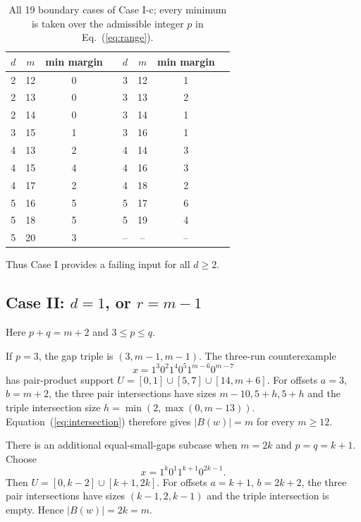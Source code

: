 \documentclass[11pt,a4paper]{article}
\newcommand{\wt}[1]{\lvert #1\rvert}
\begin{document}
\begin{table}[ht]
\centering\small\setlength{\tabcolsep}{7pt}
\begin{tabular}{cccc|cccc}
\toprule
$d$ & $m$ & min margin & \hspace{6mm} & $d$ & $m$ & min margin & \\\midrule
2&12&0&&3&12&1&\\
2&13&0&&3&13&2&\\
2&14&0&&3&14&1&\\
3&15&1&&3&16&1&\\
4&13&2&&4&14&3&\\
4&15&4&&4&16&3&\\
4&17&2&&4&18&2&\\
5&16&5&&5&17&6&\\
5&18&5&&5&19&4&\\
5&20&3&&--&--&--&\\
\bottomrule
\end{tabular}
\caption{All 19 boundary cases of Case I-c; every minimum is taken over the admissible integer $p$ in Eq.~(\ref{eq:range}).}\label{tab:boundary}
\end{table}
Thus Case I provides a failing input for all $d\ge2$.

\subsection{Case II: $d=1$, or $r=m-1$}
Here $p+q=m+2$ and $3\le p\le q$.

If $p=3$, the gap triple is $(3,m-1,m-1)$. The three-run counterexample
\begin{equation}\label{eq:caseII-A}
 x=1^3 0^2 1^4 0^5 1^{m-6}0^{m-7}
\end{equation}
has pair-product support $U=[0,1]\cup[5,7]\cup[14,m+6]$. For offsets $a=3$, $b=m+2$, the three pair intersections have sizes $m-10,5+h,5+h$ and the triple intersection size $h=\min(2,\max(0,m-13))$. Equation~(\ref{eq:intersection}) therefore gives $\wt{B(w)}=m$ for every $m\ge12$.

There is an additional equal-small-gaps subcase when $m=2k$ and $p=q=k+1$. Choose
\begin{equation}\label{eq:caseII-E}
 x=1^k 0^1 1^{k+1}0^{2k-1}.
\end{equation}
Then $U=[0,k-2]\cup[k+1,2k]$. For offsets $a=k+1$, $b=2k+2$, the three pair intersections have sizes $(k-1,2,k-1)$ and the triple intersection is empty. Hence $\wt{B(w)}=2k=m$.
\end{document}
